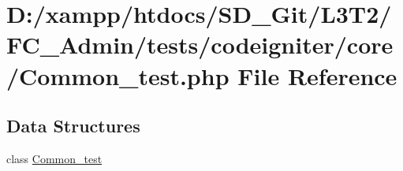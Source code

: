 \hypertarget{_common__test_8php}{}\section{D\+:/xampp/htdocs/\+S\+D\+\_\+\+Git/\+L3\+T2/\+F\+C\+\_\+\+Admin/tests/codeigniter/core/\+Common\+\_\+test.php File Reference}
\label{_common__test_8php}
\subsection*{Data Structures}
\begin{DoxyCompactItemize}
\item 
class \hyperlink{class_common__test}{Common\+\_\+test}
\end{DoxyCompactItemize}
